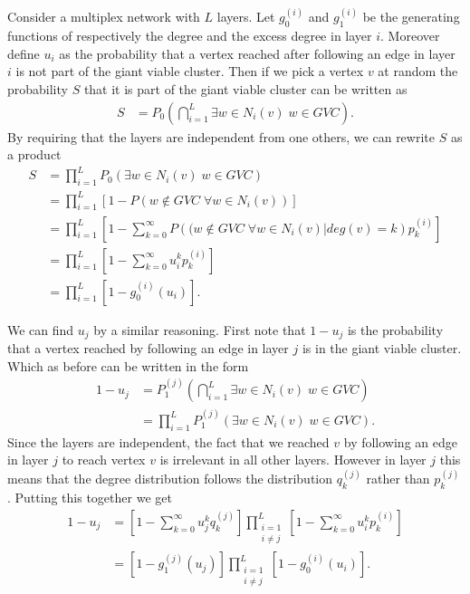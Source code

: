 \documentclass[
11pt, %
english, %
singlespacing, %
nolistspacing, %
liststotoc, %
headsepline, %
]{MastersDoctoralThesis} %
\begin{document}
Consider a multiplex network with $L$ layers. Let $g_0^{(i)}$ and $g_1^{(i)}$ be the generating functions of respectively the degree and the excess degree in layer $i$. Moreover define $u_i$ as the probability that a vertex reached after following an edge in layer $i$ is not part of the giant viable cluster. Then if we pick a vertex $v$ at random the probability $S$ that it is part of the giant viable cluster can be written as
\begin{align}
	S &= P_0\left(\bigcap_{i = 1}^{L} \exists w \in N_i(v) \; w \in GVC \right).
\end{align}
By requiring that the layers are independent from one others, we can rewrite $S$ as a product
\begin{align}
	S &= \prod_{i = 1}^{L}  P_0\left(\exists w \in N_i(v) \; w \in GVC\right) \\
		&=\prod_{i = 1}^{L}  \left[1 - P\left(w \notin GVC \; \forall w \in N_i(v)\right) \right] \\
		&=\prod_{i = 1}^{L}  \left[1 - \sum_{k = 0}^{\infty} P\left((w \notin GVC \; \forall w \in N_i(v) | deg(v) = k \right) p^{(i)}_k \right] \\
		&=\prod_{i = 1}^{L}  \left[1 - \sum_{k = 0}^{\infty} u_i^k p^{(i)}_k \right] \\
		&=\prod_{i = 1}^{L}  \left[1 - g_0^{(i)}(u_i) \right].\label{Multiplex GCC size final}
\end{align}

We can find $u_j$ by a similar reasoning. First note that $1 - u_j$ is the probability that a vertex reached by following an edge in layer $j$ is in the giant viable cluster. Which as before can be written in the form
\begin{align}
	1 - u_j &= P_1^{(j)}\left(\bigcap_{i = 1}^{L} \exists w \in N_i(v) \; w \in GVC\right)\\
	&= \prod_{i = 1}^{L}  P_1^{(j)}\left(\exists w \in N_i(v) \; w \in GVC \right).
\end{align}
Since the layers are independent, the fact that we reached $v$ by following an edge in layer $j$ to reach vertex $v$ is irrelevant in all other layers. However in layer $j$ this means that the degree distribution follows the distribution $q_k^{(j)}$ rather than $p_k^{(j)}$. Putting this together we get
\begin{align}
	1 - u_j &= \left[1 - \sum_{k = 0}^{\infty} u_j^k q_k^{(j)} \right] \prod_{\substack{i = 1 \\ i \neq j}}^{L}  \left[1 - \sum_{k = 0}^{\infty} u_i^k p^{(i)}_k \right] \\
	&= \left[1 - g_1^{(j)}(u_j) \right] \prod_{\substack{i = 1 \\ i \neq j}}^{L}  \left[1 - g_0^{(i)}(u_i) \right]. \label{Multiplex u final}
\end{align}
\end{document}

